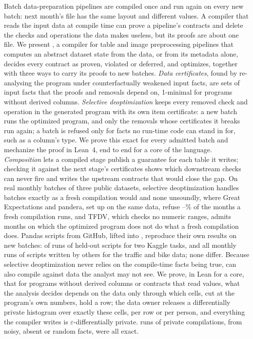 Batch data-preparation pipelines are compiled once and run again on every new batch: next
month's file has the same layout and different values. A compiler that reads the input data at
compile time can prove a pipeline's contracts and delete the checks and operations the data makes
useless, but its proofs are about one file. We present \PL, a compiler for table and image
preprocessing pipelines that computes an abstract dataset state from the data, or from its
metadata alone, decides every contract as proven, violated or deferred, and optimizes, together
with three ways to carry its proofs to new batches. \emph{Data certificates}, found by re-analysing
the program under counterfactually weakened input facts, are sets of input facts that the proofs
and removals depend on, 1-minimal for programs without derived columns. \emph{Selective deoptimization} keeps every removed check and
operation in the generated program with its own item certificate: a new batch runs the optimized
program, and only the removals whose certificates it breaks run again; a batch is refused only for
facts no run-time code can stand in for, such as a column's type. We prove this exact for every
admitted batch and mechanize the proof in Lean~4, end to end for a core of the language. \emph{Composition} lets a compiled stage
publish a guarantee for each table it writes; checking it against the next stage's certificates
shows which downstream checks can never fire and writes the upstream contracts that would close
the gap. On \RealRuns{} real monthly batches of three public datasets, selective deoptimization
handles \RealDeoptCorrect{} batches exactly as a fresh compilation would and none
unsoundly, where Great Expectations and pandera, set up on the same data, refuse
\RealValidatorStopMin--\RealValidatorStopMax\% of the months a fresh compilation runs, and TFDV,
which checks no numeric ranges, admits months on which the optimized program does not do what a fresh
compilation does. Pandas scripts from GitHub, lifted into \PL, reproduce their own
results on new batches: \CorpusBothSame{} of \CorpusBothRuns{} runs of \CorpusBothLifted{} held-out
scripts for two Kaggle tasks, and all \DriftRuns{} monthly runs of \DriftCompiled{} scripts written by
others for the traffic and bike data; none differ. Because selective deoptimization never relies on
the compile-time facts being true, \PL can also compile against data the analyst may not see. We prove,
in Lean for a core, that for programs without derived columns or contracts that read values, what the
analysis decides depends on the data only through which cells, cut at the program's own numbers, hold a
row; the data owner releases a differentially private histogram over
exactly these cells, per row or per person, and everything the compiler writes is
$\varepsilon$-differentially private. \PrivRuns{} runs of \PrivCompilations{} private compilations, from noisy,
absent or random facts, were all exact.
